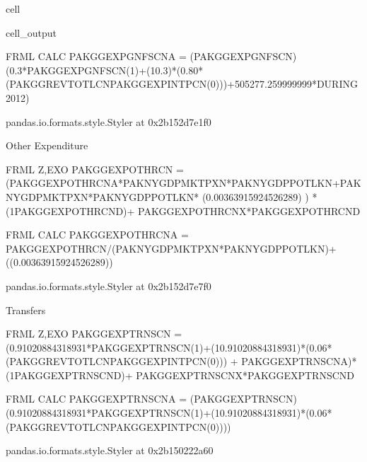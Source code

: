 \documentclass[letterpaper,10pt,english]{jupyterBook}
\begin{document}
\begin{sphinxuseclass}{cell}
\begin{sphinxVerbatimOutput}
\begin{sphinxuseclass}{cell_output}
\begin{sphinxVerbatim}[commandchars=\\\{\}]
FRML \PYGZlt{}CALC\PYGZgt{} PAKGGEXPGNFSCN\PYGZus{}A = (PAKGGEXPGNFSCN) \PYGZhy{} (0.3*PAKGGEXPGNFSCN(\PYGZhy{}1)+(1\PYGZhy{}0.3)*(0.80*(PAKGGREVTOTLCN\PYGZhy{}PAKGGEXPINTPCN(\PYGZhy{}0)))+505277.259999999*DURING\PYGZus{}2012)\PYGZdl{}
\end{sphinxVerbatim}

\begin{sphinxVerbatim}[commandchars=\\\{\}]
\PYGZlt{}pandas.io.formats.style.Styler at 0x2b152d7e1f0\PYGZgt{}
\end{sphinxVerbatim}

\begin{sphinxVerbatim}[commandchars=\\\{\}]
Other Expenditure

FRML \PYGZlt{}Z,EXO\PYGZgt{} PAKGGEXPOTHRCN = (\PYGZhy{}PAKGGEXPOTHRCN\PYGZus{}A*PAKNYGDPMKTPXN*PAKNYGDPPOTLKN+PAKNYGDPMKTPXN*PAKNYGDPPOTLKN* (\PYGZhy{}0.00363915924526289) ) * (1\PYGZhy{}PAKGGEXPOTHRCN\PYGZus{}D)+ PAKGGEXPOTHRCN\PYGZus{}X*PAKGGEXPOTHRCN\PYGZus{}D  \PYGZdl{}

FRML \PYGZlt{}CALC\PYGZgt{} PAKGGEXPOTHRCN\PYGZus{}A = \PYGZhy{}PAKGGEXPOTHRCN/(PAKNYGDPMKTPXN*PAKNYGDPPOTLKN)+ ((\PYGZhy{}0.00363915924526289)) \PYGZdl{}
\end{sphinxVerbatim}

\begin{sphinxVerbatim}[commandchars=\\\{\}]
\PYGZlt{}pandas.io.formats.style.Styler at 0x2b152d7e7f0\PYGZgt{}
\end{sphinxVerbatim}

\begin{sphinxVerbatim}[commandchars=\\\{\}]
Transfers

FRML \PYGZlt{}Z,EXO\PYGZgt{} PAKGGEXPTRNSCN = (0.91020884318931*PAKGGEXPTRNSCN(\PYGZhy{}1)+(1\PYGZhy{}0.91020884318931)*(0.06*(PAKGGREVTOTLCN\PYGZhy{}PAKGGEXPINTPCN(\PYGZhy{}0))) + PAKGGEXPTRNSCN\PYGZus{}A)* (1\PYGZhy{}PAKGGEXPTRNSCN\PYGZus{}D)+ PAKGGEXPTRNSCN\PYGZus{}X*PAKGGEXPTRNSCN\PYGZus{}D  \PYGZdl{}

FRML \PYGZlt{}CALC\PYGZgt{} PAKGGEXPTRNSCN\PYGZus{}A = (PAKGGEXPTRNSCN) \PYGZhy{} (0.91020884318931*PAKGGEXPTRNSCN(\PYGZhy{}1)+(1\PYGZhy{}0.91020884318931)*(0.06*(PAKGGREVTOTLCN\PYGZhy{}PAKGGEXPINTPCN(\PYGZhy{}0))))\PYGZdl{}
\end{sphinxVerbatim}

\begin{sphinxVerbatim}[commandchars=\\\{\}]
\PYGZlt{}pandas.io.formats.style.Styler at 0x2b150222a60\PYGZgt{}
\end{sphinxVerbatim}

\end{sphinxuseclass}\end{sphinxVerbatimOutput}

\end{sphinxuseclass}
\end{document}
